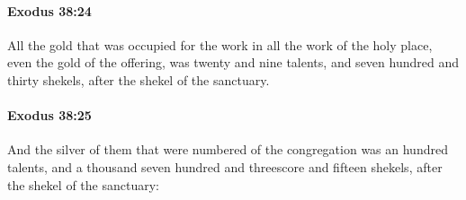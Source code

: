 		\paragraph{Exodus 38:24} %
			\label{EXODUS-38-24}

			All the gold that was occupied for the work in all the work of the holy place, even the gold of the offering, was twenty and nine talents, and seven hundred and thirty shekels, after the shekel of the sanctuary.


		\paragraph{Exodus 38:25} %
			\label{EXODUS-38-25}

			And the silver of them that were numbered of the congregation was an hundred talents, and a thousand seven hundred and threescore and fifteen shekels, after the shekel of the sanctuary:

